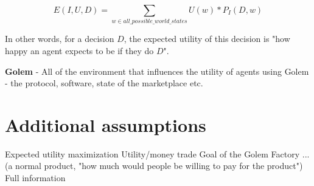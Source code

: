 \documentclass{article}
\begin{document}
$$
E(I, U, D) = \sum_{w \in all\_possible\_world\_states}U(w) * P_I(D, w)
$$

In other words, for a decision $D$, the expected utility of this decision is "how happy an agent expects to be if they do $D$".
\newline

\textbf{Golem} - All of the environment that influences the utility of agents using Golem - the protocol, software, state of the marketplace etc.
\newline

\section{Additional assumptions}

Expected utility maximization
Utility/money trade 
Goal of the Golem Factory ... (a normal product, "how much would people be willing to pay for the product")
Full information
\end{document}

